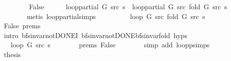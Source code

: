 \begin{isabellebody}
\ \ \isamarkupfalse%
\isanewline
\ \ \ \ \isamarkupfalse%
\ False\isanewline
\ \ \ \ \isamarkupfalse%
\ {\isachardoublequoteopen}loop{\isacharunderscore}{\kern0pt}partial\ G\ src\ s\ {\isacharequal}{\kern0pt}\ loop{\isacharunderscore}{\kern0pt}partial\ G\ src\ {\isacharparenleft}{\kern0pt}fold\ G\ src\ s{\isacharparenright}{\kern0pt}{\isachardoublequoteclose}\isanewline
\ \ \ \ \ \ \isamarkupfalse%
\ {\isacharparenleft}{\kern0pt}metis\ loop{\isacharunderscore}{\kern0pt}partial{\isachardot}{\kern0pt}simps{\isacharparenright}{\kern0pt}\isanewline
\ \ \ \ \isamarkupfalse%
\ \isamarkupfalse%
\ {\isachardoublequoteopen}{\isachardot}{\kern0pt}{\isachardot}{\kern0pt}{\isachardot}{\kern0pt}\ {\isacharequal}{\kern0pt}\ loop\ G\ src\ {\isacharparenleft}{\kern0pt}fold\ G\ src\ s{\isacharparenright}{\kern0pt}{\isachardoublequoteclose}\isanewline
\ \ \ \ \ \ \isamarkupfalse%
\ False\ {\isachardoublequoteopen}{}{\isachardot}{\kern0pt}prems{\isachardoublequoteclose}\isanewline
\ \ \ \ \ \ \isamarkupfalse%
\ {\isacharparenleft}{\kern0pt}intro\ bfs{\isacharunderscore}{\kern0pt}invar{\isacharunderscore}{\kern0pt}not{\isacharunderscore}{\kern0pt}DONE{\isacharprime}{\kern0pt}I\ bfs{\isacharunderscore}{\kern0pt}invar{\isacharunderscore}{\kern0pt}not{\isacharunderscore}{\kern0pt}DONE{\isachardot}{\kern0pt}bfs{\isacharunderscore}{\kern0pt}invar{\isacharunderscore}{\kern0pt}fold\ {\isachardoublequoteopen}{}{\isachardot}{\kern0pt}hyps{\isachardoublequoteclose}{\isacharparenright}{\kern0pt}\isanewline
\ \ \ \ \isamarkupfalse%
\ \isamarkupfalse%
\ {\isachardoublequoteopen}{\isachardot}{\kern0pt}{\isachardot}{\kern0pt}{\isachardot}{\kern0pt}\ {\isacharequal}{\kern0pt}\ loop\ G\ src\ s{\isachardoublequoteclose}\isanewline
\ \ \ \ \ \ \isamarkupfalse%
\ {\isachardoublequoteopen}{}{\isachardot}{\kern0pt}prems{\isachardoublequoteclose}\ False\isanewline
\ \ \ \ \ \ \isamarkupfalse%
\ {\isacharparenleft}{\kern0pt}simp\ add{\isacharcolon}{\kern0pt}\ loop{\isacharunderscore}{\kern0pt}psimps{\isacharparenright}{\kern0pt}\isanewline
\ \ \ \ \isamarkupfalse%
\ \isamarkupfalse%
\ {\isacharquery}{\kern0pt}thesis\isanewline
\ \ \ \ \ \ \isacommand{{\isachardot}{\kern0pt}}\isamarkupfalse%
\isanewline
\ \ \isamarkupfalse%
\isanewline
{}\isamarkupfalse%
%
\endisatagproof
{\isafoldproof}%
%
\isadelimproof

\end{isabellebody}
